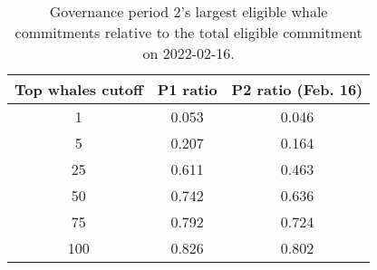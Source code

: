 %
\begin{longtable}[c]{ c c c }
\caption{Governance period 2's largest eligible whale commitments relative to the total eligible commitment on 2022-02-16.} \\
\hline
\textbf{Top whales cutoff} & \textbf{P1 ratio} & \textbf{P2 ratio (Feb. 16)} \\
\hline
1 & 0.053 & 0.046 \\ 
5 & 0.207 & 0.164 \\ 
25 & 0.611 & 0.463 \\ 
50 & 0.742 & 0.636 \\ 
75 & 0.792 & 0.724 \\ 
100 & 0.826 & 0.802 \\ 
\hline 
\end{longtable} 
